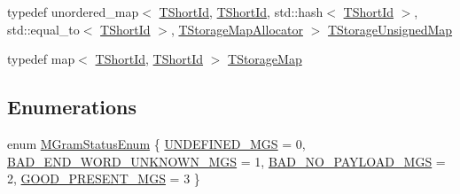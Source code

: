 \begin{DoxyCompactItemize}
typedef unordered\+\_\+map$<$ \hyperlink{namespaceuva_1_1smt_1_1bpbd_1_1server_1_1lm_1_1identifiers_a33043a191e9a637dea742a89d23c8bdc}{T\+Short\+Id}, \hyperlink{namespaceuva_1_1smt_1_1bpbd_1_1server_1_1lm_1_1identifiers_a33043a191e9a637dea742a89d23c8bdc}{T\+Short\+Id}, std\+::hash$<$ \hyperlink{namespaceuva_1_1smt_1_1bpbd_1_1server_1_1lm_1_1identifiers_a33043a191e9a637dea742a89d23c8bdc}{T\+Short\+Id} $>$, std\+::equal\+\_\+to$<$ \hyperlink{namespaceuva_1_1smt_1_1bpbd_1_1server_1_1lm_1_1identifiers_a33043a191e9a637dea742a89d23c8bdc}{T\+Short\+Id} $>$, \hyperlink{namespaceuva_1_1smt_1_1bpbd_1_1server_1_1lm_a70b67dc80579cc0df5e9509d40b2563a}{T\+Storage\+Map\+Allocator} $>$ \hyperlink{namespaceuva_1_1smt_1_1bpbd_1_1server_1_1lm_a26bc64a9a6f92c48c443c82b33035e60}{T\+Storage\+Unsigned\+Map}
\item 
typedef map$<$ \hyperlink{namespaceuva_1_1smt_1_1bpbd_1_1server_1_1lm_1_1identifiers_a33043a191e9a637dea742a89d23c8bdc}{T\+Short\+Id}, \hyperlink{namespaceuva_1_1smt_1_1bpbd_1_1server_1_1lm_1_1identifiers_a33043a191e9a637dea742a89d23c8bdc}{T\+Short\+Id} $>$ \hyperlink{namespaceuva_1_1smt_1_1bpbd_1_1server_1_1lm_a848930f30620014225832ed8d3e6a93e}{T\+Storage\+Map}
\end{DoxyCompactItemize}
\subsection*{Enumerations}
\begin{DoxyCompactItemize}
\item 
enum \hyperlink{namespaceuva_1_1smt_1_1bpbd_1_1server_1_1lm_ab9b3e7382b561dcb8abcd6b55e9b796a}{M\+Gram\+Status\+Enum} \{ \hyperlink{namespaceuva_1_1smt_1_1bpbd_1_1server_1_1lm_ab9b3e7382b561dcb8abcd6b55e9b796aa9019f6deb96568ca044e6c1849e446cb}{U\+N\+D\+E\+F\+I\+N\+E\+D\+\_\+\+M\+G\+S} = 0, 
\hyperlink{namespaceuva_1_1smt_1_1bpbd_1_1server_1_1lm_ab9b3e7382b561dcb8abcd6b55e9b796aab88dace63609938caf3106666433cd1c}{B\+A\+D\+\_\+\+E\+N\+D\+\_\+\+W\+O\+R\+D\+\_\+\+U\+N\+K\+N\+O\+W\+N\+\_\+\+M\+G\+S} = 1, 
\hyperlink{namespaceuva_1_1smt_1_1bpbd_1_1server_1_1lm_ab9b3e7382b561dcb8abcd6b55e9b796aaf10f109b34b87eedfb0ec95d81bfa931}{B\+A\+D\+\_\+\+N\+O\+\_\+\+P\+A\+Y\+L\+O\+A\+D\+\_\+\+M\+G\+S} = 2, 
\hyperlink{namespaceuva_1_1smt_1_1bpbd_1_1server_1_1lm_ab9b3e7382b561dcb8abcd6b55e9b796aa4682346ec5c105689f1d0bc41af318a9}{G\+O\+O\+D\+\_\+\+P\+R\+E\+S\+E\+N\+T\+\_\+\+M\+G\+S} = 3
 \}
\end{DoxyCompactItemize}
